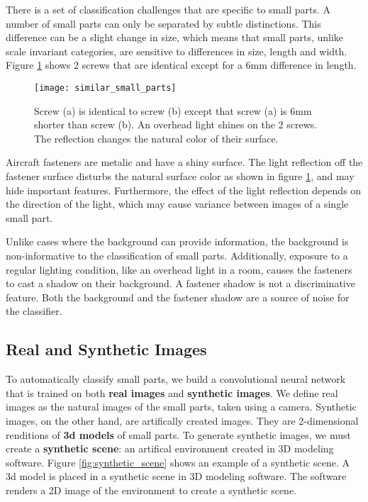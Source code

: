 There is a set of classification challenges that are specific to small parts. A number of small parts can only be separated by subtle distinctions. This difference can be a slight change in size, which means that small parts, unlike scale invariant categories, are sensitive to differences in size, length and width. Figure \ref{fig:similar_small_parts} shows 2 screws that are identical except for a 6mm difference in length.

\begin{figure}[h]
\centering
  \texttt{[image: similar\_small\_parts]}
\caption{Screw (a) is identical to screw (b) except that screw (a) is 6mm shorter than screw (b). An overhead light shines on the 2 screws. The reflection changes the natural color of their surface.}
\label{fig:similar_small_parts}
\end{figure}

Aircraft fasteners are metalic and have a shiny surface. The light reflection off the fastener surface disturbs the natural surface color as shown in figure \ref{fig:similar_small_parts}, and may hide important features. Furthermore, the effect of the light reflection depends on the direction of the light, which may cause variance between images of a single small part.

Unlike cases where the background can provide information, the background is non-informative to the classification of small parts. Additionally, exposure to a regular lighting condition, like an overhead light in a room, causes the fasteners to cast a shadow on their background. A fastener shadow is not a discriminative feature. Both the background and the fastener shadow are a source of noise for the classifier.

\subsection{Real and Synthetic Images}
To automatically classify small parts, we build a convolutional neural network that is trained on both \textbf{real images} and \textbf{synthetic images}. We define real images as the natural images of the small parts, taken using a camera. Synthetic images, on the other hand, are artifically created images. They are 2-dimensional renditions of \textbf{3d models} of small parts. To generate synthetic images, we must create a \textbf{synthetic scene}: an artifical environment created in 3D modeling software. Figure \ref{fig:synthetic_scene} shows an example of a synthetic scene. A 3d model is placed in a synthetic scene in 3D modeling software. The software renders a 2D image of the environment to create a synthetic scene.

